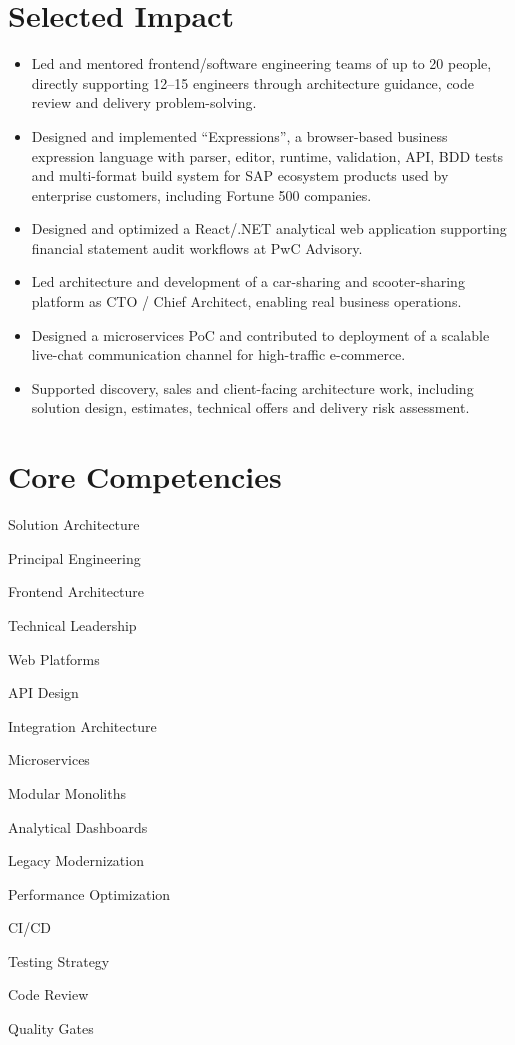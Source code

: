 \documentclass[10pt,a4paper]{article}
\newcommand{\cvtag}[1]{%
  \begingroup
  \setlength{\fboxsep}{3pt}%
  \colorbox{softgray}{\strut\small #1}%
  \endgroup
}
\newcommand{\cvtagrow}[1]{%
  \noindent #1\par\vspace{3pt}%
}
\begin{document}
\section{Selected Impact}

\begin{itemize}
  \item Led and mentored frontend/software engineering teams of up to 20 people, directly supporting 12--15 engineers through architecture guidance, code review and delivery problem-solving.
  \item Designed and implemented ``Expressions'', a browser-based business expression language with parser, editor, runtime, validation, API, BDD tests and multi-format build system for SAP ecosystem products used by enterprise customers, including Fortune 500 companies.
  \item Designed and optimized a React/.NET analytical web application supporting financial statement audit workflows at PwC Advisory.
  \item Led architecture and development of a car-sharing and scooter-sharing platform as CTO / Chief Architect, enabling real business operations.
  \item Designed a microservices PoC and contributed to deployment of a scalable live-chat communication channel for high-traffic e-commerce.
  \item Supported discovery, sales and client-facing architecture work, including solution design, estimates, technical offers and delivery risk assessment.
\end{itemize}

\section{Core Competencies}

\cvtagrow{%
  \cvtag{Solution Architecture}\hspace{3pt}%
  \cvtag{Principal Engineering}\hspace{3pt}%
  \cvtag{Frontend Architecture}\hspace{3pt}%
  \cvtag{Technical Leadership}\hspace{3pt}%
  \cvtag{Web Platforms}%
}
\cvtagrow{%
  \cvtag{API Design}\hspace{3pt}%
  \cvtag{Integration Architecture}\hspace{3pt}%
  \cvtag{Microservices}\hspace{3pt}%
  \cvtag{Modular Monoliths}\hspace{3pt}%
  \cvtag{Analytical Dashboards}%
}
\cvtagrow{%
  \cvtag{Legacy Modernization}\hspace{3pt}%
  \cvtag{Performance Optimization}\hspace{3pt}%
  \cvtag{CI/CD}\hspace{3pt}%
  \cvtag{Testing Strategy}\hspace{3pt}%
  \cvtag{Code Review}\hspace{3pt}%
  \cvtag{Quality Gates}%
}
\end{document}
